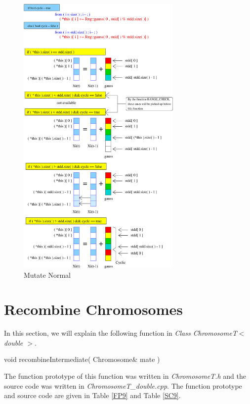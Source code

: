 \documentclass[twocolumn]{article}
\begin{document}
\begin{figure}[h]
\begin{center}
\includegraphics[width=8cm]{004-4-6-mutateNormal1.eps}
\caption{Mutate Normal}
\label{MutateNormal}
\end{center}
\end{figure}

\section{Recombine Chromosomes}

\noindent
In this section, we will explain the following function in {\em Class
ChromosomeT$<$ double $>$}. 

\begin{center}
void recombineIntermediate( Chromosome\& mate )
\end{center}

\noindent
The function prototype of this function was written in {\em
ChromosomeT.h} and the source code was written in {\em
ChromosomeT\_double.cpp}. The function prototype and source code are
given in Table \ref{FP9} and Table \ref{SC9}.
\end{document}
